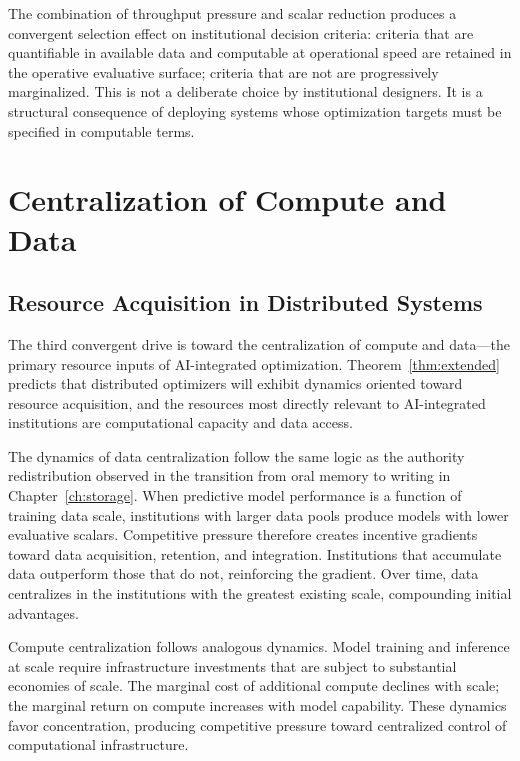 \documentclass[12pt, oneside]{book}
\theoremstyle{plain}
\theoremstyle{definition}
\theoremstyle{remark}
\theoremstyle{definition}
\begin{document}
The combination of throughput pressure and scalar reduction produces a convergent
selection effect on institutional decision criteria: criteria that are quantifiable
in available data and computable at operational speed are retained in the operative
evaluative surface; criteria that are not are progressively marginalized. This is not
a deliberate choice by institutional designers. It is a structural consequence of
deploying systems whose optimization targets must be specified in computable terms.

\chapter{Centralization of Compute and Data}
\label{ch:centralization}

\section{Resource Acquisition in Distributed Systems}

The third convergent drive is toward the centralization of compute and data---the
primary resource inputs of AI-integrated optimization. Theorem~\ref{thm:extended}
predicts that distributed optimizers will exhibit dynamics oriented toward resource
acquisition, and the resources most directly relevant to AI-integrated institutions
are computational capacity and data access.

The dynamics of data centralization follow the same logic as the authority redistribution
observed in the transition from oral memory to writing in Chapter~\ref{ch:storage}.
When predictive model performance is a function of training data scale, institutions
with larger data pools produce models with lower evaluative scalars. Competitive
pressure therefore creates incentive gradients toward data acquisition, retention, and
integration. Institutions that accumulate data outperform those that do not, reinforcing
the gradient. Over time, data centralizes in the institutions with the greatest
existing scale, compounding initial advantages.

Compute centralization follows analogous dynamics. Model training and inference at
scale require infrastructure investments that are subject to substantial economies of
scale. The marginal cost of additional compute declines with scale; the marginal
return on compute increases with model capability. These dynamics favor concentration,
producing competitive pressure toward centralized control of computational
infrastructure.
\end{document}
